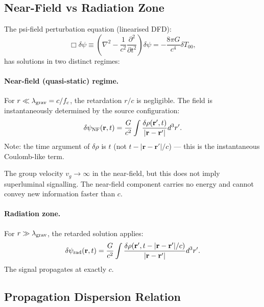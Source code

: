 \documentclass[aps,prd,twocolumn,superscriptaddress,nofootinbib]{revtex4-2}
\begin{document}
\subsection{Near-Field vs Radiation Zone}

The psi-field perturbation equation (linearised DFD):
\begin{equation}
\Box\delta\psi \equiv \left(\nabla^2 - \frac{1}{c^2}\frac{\partial^2}{\partial t^2}\right)\delta\psi
= -\frac{8\pi G}{c^4} \delta T_{00},
\label{eq:psi-wave}
\end{equation}
has solutions in two distinct regimes:

\paragraph{Near-field (quasi-static) regime.}
For $r \ll \lambda_{\rm grav} = c/f_c$, the retardation $r/c$ is negligible.
The field is instantaneously determined by the source configuration:
\begin{equation}
\delta\psi_{\rm NF}(\mathbf{r},t) = \frac{G}{c^2}\int\frac{\delta\rho(\mathbf{r}',t)}{|\mathbf{r}-\mathbf{r}'|} d^3r'.
\label{eq:psi-NF}
\end{equation}
Note: the time argument of $\delta\rho$ is $t$ (not $t - |\mathbf{r}-\mathbf{r}'|/c$)
--- this is the instantaneous Coulomb-like term.

The group velocity $v_g \to \infty$ in the near-field, but this does not
imply superluminal signalling. The near-field component carries no
energy and cannot convey new information faster than $c$.

\paragraph{Radiation zone.}
For $r \gg \lambda_{\rm grav}$, the retarded solution applies:
\begin{equation}
\delta\psi_{\rm rad}(\mathbf{r},t) = \frac{G}{c^2}\int\frac{\delta\rho(\mathbf{r}',t-|\mathbf{r}-\mathbf{r}'|/c)}{|\mathbf{r}-\mathbf{r}'|} d^3r'.
\label{eq:psi-rad}
\end{equation}
The signal propagates at exactly $c$.

\subsection{Propagation Dispersion Relation}
\end{document}
